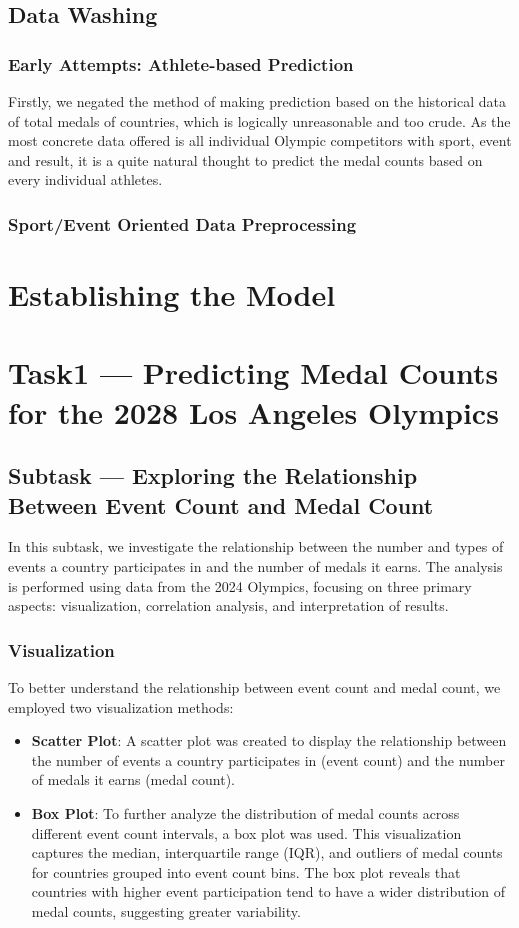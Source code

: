 \documentclass{mcmthesis}
\begin{document}
\subsection{Data Washing}
\subsubsection{Early Attempts: Athlete-based Prediction}
Firstly, we negated the method of making prediction based on the historical data of total medals of countries, which is logically unreasonable and too crude. As the most concrete data offered is all individual Olympic competitors with sport, event and result, it is a quite natural thought to predict the medal counts based on every individual athletes.

\subsubsection{Sport/Event Oriented Data Preprocessing}



\section{Establishing the Model}

\section{Task1 --- Predicting Medal Counts for the 2028 Los Angeles Olympics}
\subsection{Subtask --- Exploring the Relationship Between Event Count and Medal Count}

In this subtask, we investigate the relationship between the number and types of events a country participates in and the number of medals it earns. The analysis is performed using data from the 2024 Olympics, focusing on three primary aspects: visualization, correlation analysis, and interpretation of results.

\subsubsection{Visualization}
To better understand the relationship between event count and medal count, we employed two visualization methods:
\begin{itemize}
    \item \textbf{Scatter Plot}: A scatter plot was created to display the relationship between the number of events a country participates in (event count) and the number of medals it earns (medal count).  
    \item \textbf{Box Plot}: To further analyze the distribution of medal counts across different event count intervals, a box plot was used. This visualization captures the median, interquartile range (IQR), and outliers of medal counts for countries grouped into event count bins. The box plot reveals that countries with higher event participation tend to have a wider distribution of medal counts, suggesting greater variability.
\end{itemize}
\end{document}

